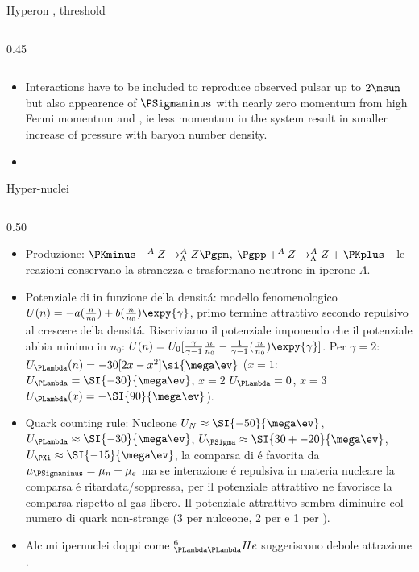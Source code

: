 \begin{frame}{Hyperon \PLambda, \PSigmaminus threshold}
\begin{columns}[T]
\begin{column}{0.45\textwidth}
\begin{itemize}
            \end{itemize}
        \end{column}
    \end{columns}
    \begin{itemize}
        \item Interactions have to be included to reproduce observed pulsar up to $2\msun$ but also appearence of $\PSigmaminus$ with nearly zero momentum from high Fermi momentum \Pelectron and \Pneutron, ie less momentum in the system result in smaller increase of pressure with baryon number density.
        \item 
    \end{itemize}
\end{frame}

\begin{frame}{Hyper-nuclei}
    \begin{columns}[T]
        \begin{column}{0.50\textwidth}
            \begin{itemize}
                \item Produzione: $\PKminus+^AZ\to^A_{\Lambda}Z\Pgpm$, $\Pgpp+^AZ\to^A_{\Lambda}Z+\PKplus$ - le reazioni conservano la stranezza e trasformano neutrone in iperone $\Lambda$.
                \item Potenziale di \PLambda in funzione della densit\'a: modello fenomenologico $U(n)=-a(\frac{n}{n_0})+b(\frac{n}{n_0})\expy{\gamma}$, primo termine attrattivo secondo repulsivo al crescere della densit\'a. Riscriviamo il potenziale imponendo che il potenziale abbia minimo in $n_0$: $U(n)=U_0[\frac{\gamma}{\gamma-1}\frac{n}{n_0}-\frac{1}{\gamma-1}(\frac{n}{n_0})\expy{\gamma}]$. Per $\gamma=2$: $U_{\PLambda}(n)=-30[2x-x^2]\si{\mega\ev}$ ($x=1$: $U_{\PLambda}=\SI{-30}{\mega\ev}$, $x=2$ $U_{\PLambda}=0$, $x=3$ $U_{\PLambda}(x)=-\SI{90}{\mega\ev}$).
                \item Quark counting rule: Nucleone $U_N\approx\SI{-50}{\mega\ev}$, $U_{\PLambda}\approx\SI{-30}{\mega\ev}$, $U_{\PSigma}\approx\SI{30+-20}{\mega\ev}$, $U_{\PXi}\approx\SI{-15}{\mega\ev}$, la comparsa di \PSigmaminus \'e favorita da $\mu_{\PSigmaminus}=\mu_n+\mu_{e}$ ma se interazione \'e repulsiva in materia nucleare la comparsa \'e ritardata/soppressa, per \PXi il potenziale attrattivo ne favorisce la comparsa rispetto al gas libero. Il potenziale attrattivo sembra diminuire col numero di quark non-strange (3 per nulceone, 2 per \PLambda e 1 per \PXi).
                \item Alcuni ipernuclei doppi come $^6_{\PLambda\PLambda}He$ suggeriscono debole attrazione \PLambda\PLambda.

\end{itemize}
\end{column}
\end{columns}
\end{frame}
